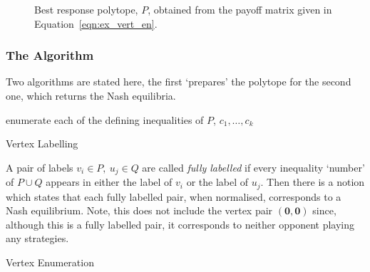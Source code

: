\begin{figure}
    \centering
    
    \caption{Best response polytope, \(P\), obtained from the payoff matrix given in Equation~\ref{eqn:ex_vert_en}.}\label{fig:best_resp_polytope}
\end{figure}

\subsubsection{The Algorithm}\label{subsubsec:The_Algorithm}

Two algorithms are stated here, the first `prepares' the polytope for the second
one, which returns the Nash equilibria.

\IncMargin{2em}
\begin{algorithm}[H]
    \DontPrintSemicolon

    enumerate each of the defining inequalities of \(P\), \(c_{1}, \ldots,
    c_{k}\) \\
    \caption{Vertex Labelling}\label{alg:vertex_lab}
\end{algorithm}
\DecMargin{2em}

A pair of labels \(v_{i} \in P, ~ u_{j} \in Q\) are called \emph{fully labelled}
if every inequality `number' of \(P \cup Q\) appears in either the label of
\(v_{i}\) or the label of \(u_{j}\). Then there is a notion which states that
each fully labelled pair, when normalised, corresponds to a Nash equilibrium.
Note, this does not include the vertex pair \((\textbf{0}, \textbf{0})\) since,
although this is a fully labelled pair, it corresponds to neither opponent playing any strategies. 

\IncMargin{2em}
\begin{algorithm}[H]
    \DontPrintSemicolon

    \caption{Vertex Enumeration}\label{alg:vertex_en}
\end{algorithm}
\DecMargin{2em}

